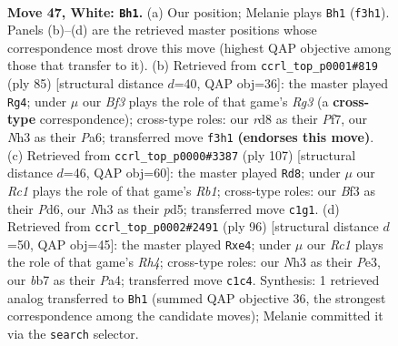 \documentclass[11pt]{article}
\begin{document}
\clearpage

\begin{figure}[p]\centering
\begin{subfigure}{0.46\textwidth}\centering
\resizebox{\linewidth}{!}{%
\newchessgame
\chessboard[
  setfen={3r2k1/1b3p1p/8/pr6/3p2P1/1P3B1N/1R1K3P/2R5 w - - 8 47},
  showmover=false,
  pgfstyle=straightmove, color=movearrow, markmove={f3-h1}
]}
\caption{}
\end{subfigure}\hfill
\begin{subfigure}{0.46\textwidth}\centering
\resizebox{\linewidth}{!}{%
\newchessgame
\chessboard[
  setfen={4r1k1/5p2/p2p2r1/7b/2PpP3/1P1R2B1/6P1/4R1K1 b - - 1 43},
  showmover=false,
  pgfstyle=straightmove, color=movearrow, markmove={g6-g4}
]}
\caption{}
\end{subfigure}
\\[4pt]
\begin{subfigure}{0.46\textwidth}\centering
\resizebox{\linewidth}{!}{%
\newchessgame
\chessboard[
  setfen={1r6/2r3k1/3p3p/p2PPR2/2p2P2/6P1/2R2K2/8 b - - 0 54},
  showmover=false,
  pgfstyle=straightmove, color=movearrow, markmove={b8-d8}
]}
\caption{}
\end{subfigure}\hfill
\begin{subfigure}{0.46\textwidth}\centering
\resizebox{\linewidth}{!}{%
\newchessgame
\chessboard[
  setfen={8/3brpk1/8/N1R1p1r1/P3p2R/4P3/2P5/5K2 w - - 4 49},
  showmover=false,
  pgfstyle=straightmove, color=movearrow, markmove={h4-e4}
]}
\caption{}
\end{subfigure}
\caption{\textbf{Move 47, White: \texttt{Bh1}.} (a) Our position; Melanie plays \texttt{Bh1} (\texttt{f3h1}). Panels (b)--(d) are the retrieved master positions whose correspondence most drove this move (highest QAP objective among those that transfer to it). (b) Retrieved from \texttt{ccrl\_top\_p0001\#819} (ply 85) [structural distance $d$=40, QAP obj=36]: the master played \texttt{Rg4}; under $\mu$ our \emph{Bf3} plays the role of that game's \emph{Rg3} (a \textbf{cross-type} correspondence); cross-type roles: our \emph{r}d8 as their \emph{P}f7, our \emph{N}h3 as their \emph{P}a6; transferred move \texttt{f3h1} \textbf{(endorses this move)}. (c) Retrieved from \texttt{ccrl\_top\_p0000\#3387} (ply 107) [structural distance $d$=46, QAP obj=60]: the master played \texttt{Rd8}; under $\mu$ our \emph{Rc1} plays the role of that game's \emph{Rb1}; cross-type roles: our \emph{B}f3 as their \emph{P}d6, our \emph{N}h3 as their \emph{p}d5; transferred move \texttt{c1g1}. (d) Retrieved from \texttt{ccrl\_top\_p0002\#2491} (ply 96) [structural distance $d$=50, QAP obj=45]: the master played \texttt{Rxe4}; under $\mu$ our \emph{Rc1} plays the role of that game's \emph{Rh4}; cross-type roles: our \emph{N}h3 as their \emph{P}e3, our \emph{b}b7 as their \emph{P}a4; transferred move \texttt{c1c4}. Synthesis: 1 retrieved analog transferred to \texttt{Bh1} (summed QAP objective 36, the strongest correspondence among the candidate moves); Melanie committed it via the \texttt{search} selector.}
\label{fig:thought-m92}
\end{figure}
\end{document}
